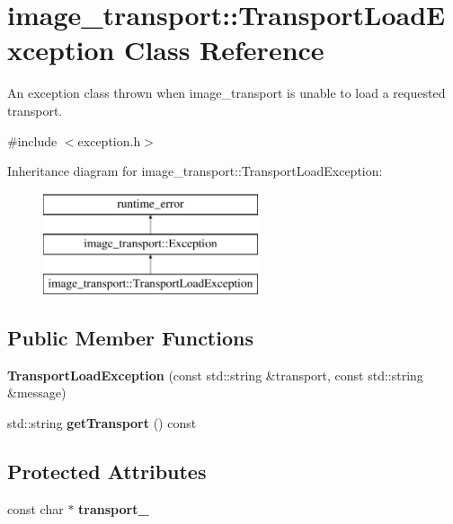 \hypertarget{classimage__transport_1_1_transport_load_exception}{\section{image\-\_\-transport\-:\-:Transport\-Load\-Exception Class Reference}
\label{classimage__transport_1_1_transport_load_exception}
}


An exception class thrown when image\-\_\-transport is unable to load a requested transport.  




{\ttfamily \#include $<$exception.\-h$>$}

Inheritance diagram for image\-\_\-transport\-:\-:Transport\-Load\-Exception\-:\begin{figure}[H]
\begin{center}
\leavevmode
\includegraphics[height=3.000000cm]{classimage__transport_1_1_transport_load_exception}
\end{center}
\end{figure}
\subsection*{Public Member Functions}
\begin{DoxyCompactItemize}
\item 
\hypertarget{classimage__transport_1_1_transport_load_exception_ae57f655548bd6acdc0a63667232a3ba8}{{\bfseries Transport\-Load\-Exception} (const std\-::string \&transport, const std\-::string \&message)}\label{classimage__transport_1_1_transport_load_exception_ae57f655548bd6acdc0a63667232a3ba8}

\item 
\hypertarget{classimage__transport_1_1_transport_load_exception_a6c79ac8f03b55513812e40f26e39e1d6}{std\-::string {\bfseries get\-Transport} () const }\label{classimage__transport_1_1_transport_load_exception_a6c79ac8f03b55513812e40f26e39e1d6}

\end{DoxyCompactItemize}
\subsection*{Protected Attributes}
\begin{DoxyCompactItemize}
\item 
\hypertarget{classimage__transport_1_1_transport_load_exception_a0f852f96a21f41580f0c4848247289ae}{const char $\ast$ {\bfseries transport\-\_\-}}\label{classimage__transport_1_1_transport_load_exception_a0f852f96a21f41580f0c4848247289ae}

\end{DoxyCompactItemize}


